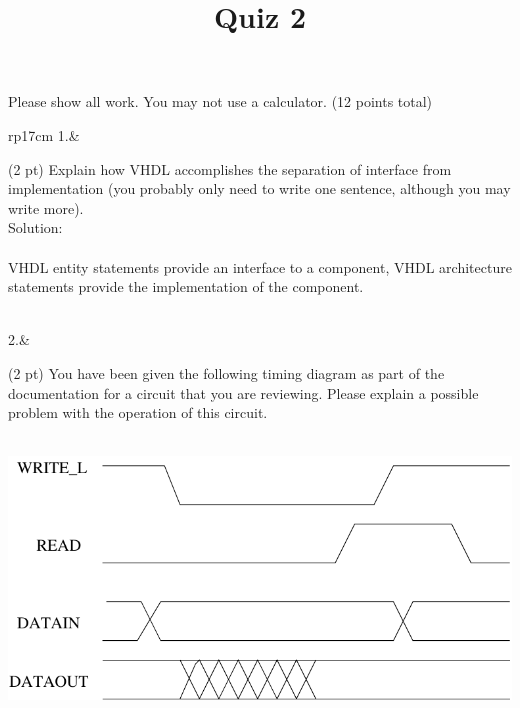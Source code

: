 \documentclass{article}
\title{Quiz 2}
\date{}
\begin{document}
\maketitle
Please show all work.  You may not use a calculator. (12 points total)
\begin{longtable}[l]{rp{17cm}}
1.&\begin{minipage}[t]{\linewidth}(2 pt) Explain how VHDL accomplishes the separation of interface from implementation (you probably only need to write one sentence, although you may write more).\\

Solution: \\ \\
VHDL entity statements provide an interface to a component, VHDL architecture statements provide the implementation of the component.
\end{minipage}\\
\medskip
2.&\begin{minipage}[t]{\linewidth}(2 pt) You have been given the following timing diagram as part of the documentation for a circuit that you are reviewing.  Please explain a possible problem with the operation of this circuit.\\ \\
\begin{center}
  \includegraphics{../CombinationalDesign/Assessments/TimingDiagramReadWrite}
\end{center}


\end{minipage}
\end{longtable}
\end{document}
